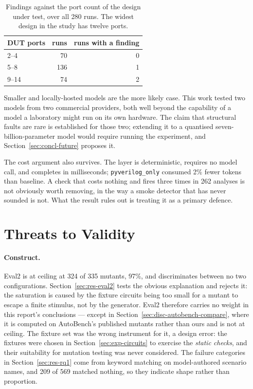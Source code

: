 \documentclass[11pt,a4paper,titlepage=false]{scrreprt}
\begin{document}
\begin{table}[H]
\centering
\small
\begin{tabular}{@{}l r r@{}}
\toprule
\textbf{DUT ports} & \textbf{runs} & \textbf{runs with a finding} \\
\midrule
2--4  &  70 & 0 \\
5--8  & 136 & 1 \\
9--14 &  74 & 2 \\
\bottomrule
\end{tabular}
\caption{Findings against the port count of the design under test, over all 280 runs. The
widest design in the study has twelve ports.}
\label{tab:ports}
\end{table}

Smaller and locally-hosted models are the more likely case. This work tested two models from
two commercial providers, both well beyond the capability of a model a laboratory might run
on its own hardware. The claim that structural faults are rare is established for those two;
extending it to a quantised seven-billion-parameter model would require running the
experiment, and Section~\ref{sec:concl-future} proposes it.

The cost argument also survives. The layer is deterministic, requires no model call, and
completes in milliseconds; \texttt{pyverilog\_only} consumed 2\% fewer tokens than baseline.
A check that costs nothing and fires three times in 262 analyses is not obviously worth
removing, in the way a smoke detector that has never sounded is not. What the result rules
out is treating it as a primary defence.

\section{Threats to Validity}\label{sec:disc-threats}

\paragraph{Construct.} Eval2 is at ceiling at 324 of 335 mutants, 97\%, and discriminates
between no two configurations. Section~\ref{sec:res-eval2} tests the obvious explanation and
rejects it: the saturation is caused by the fixture circuits being too small for a mutant to
escape a finite stimulus, not by the generator. Eval2 therefore carries no weight in this
report's conclusions --- except in Section~\ref{sec:disc-autobench-compare}, where it is
computed on AutoBench's published mutants rather than ours and is not at ceiling. The fixture
set was the wrong instrument for it, a design error: the fixtures were chosen in
Section~\ref{sec:exp-circuits} to exercise the \emph{static checks}, and their suitability
for mutation testing was never considered. The failure categories in
Section~\ref{sec:res-rq1} come from keyword matching on model-authored scenario names, and
209 of 569 matched nothing, so they indicate shape rather than proportion.
\end{document}
